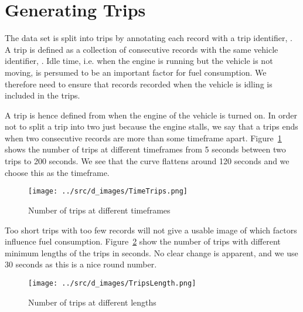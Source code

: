 \section{Generating Trips}\label{sec:trips}

The data set is split into trips by annotating each record with a trip identifier, \tid.
A trip is defined as a collection of consecutive records with the same vehicle identifier, \vid.
Idle time, i.e. when the engine is running but the vehicle is not moving, is persumed to be an important factor for fuel consumption. 
We therefore need to ensure that records recorded when the vehicle is idling is included in the trips. 

A trip is hence defined from when the engine of the vehicle is turned on.
In order not to split a trip into two just because the engine stalls, we say that a trips ends when two consecutive records are more than some timeframe apart.
Figure~\ref{fig:TimeTrips} shows the number of trips at different timeframes from 5 seconds between two trips to 200 seconds.
We see that the curve flattens around 120 seconds and we choose this as the timeframe. 
\begin{figure}[htb]
\centering
\texttt{[image: ../src/d\_images/TimeTrips.png]}
\caption{Number of trips at different timeframes}
\label{fig:TimeTrips}
\end{figure}

Too short trips with too few records will not give a usable image of which factors influence fuel consumption.
Figure~\ref{fig:LengthTrips} show the number of trips with different minimum lengths of the trips in seconds.
No clear change is apparent, and we use 30 seconds as this is a nice round number. %
\begin{figure}[htb]
\centering
\texttt{[image: ../src/d\_images/TripsLength.png]}
\caption{Number of trips at different lengths}
\label{fig:LengthTrips}
\end{figure}